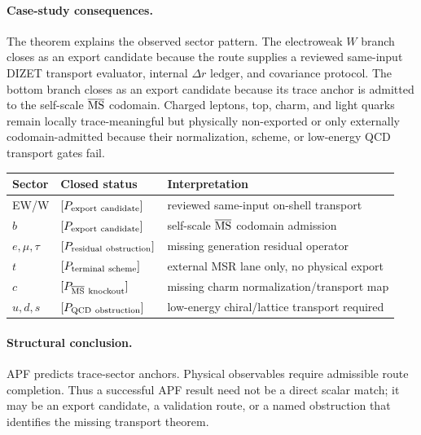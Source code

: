 \paragraph{Case-study consequences.}
The theorem explains the observed sector pattern.  The electroweak $W$ branch closes as an export candidate because the route supplies a reviewed same-input DIZET transport evaluator, internal $\Delta r$ ledger, and covariance protocol.  The bottom branch closes as an export candidate because its trace anchor is admitted to the self-scale $\overline{\rm MS}$ codomain.  Charged leptons, top, charm, and light quarks remain locally trace-meaningful but physically non-exported or only externally codomain-admitted because their normalization, scheme, or low-energy QCD transport gates fail.

\begin{center}
\begin{tabular}{lll}
\hline
Sector & Closed status & Interpretation\\
\hline
EW/W & $[P_{\rm export\ candidate}]$ & reviewed same-input on-shell transport\\
$b$ & $[P_{\rm export\ candidate}]$ & self-scale $\overline{\rm MS}$ codomain admission\\
$e,\mu,\tau$ & $[P_{\rm residual\ obstruction}]$ & missing generation residual operator\\
$t$ & $[P_{\rm terminal\ scheme}]$ & external MSR lane only, no physical export\\
$c$ & $[P_{\overline{\rm MS}\ {\rm knockout}}]$ & missing charm normalization/transport map\\
$u,d,s$ & $[P_{\rm QCD\ obstruction}]$ & low-energy chiral/lattice transport required\\
\hline
\end{tabular}
\end{center}

\paragraph{Structural conclusion.}
APF predicts trace-sector anchors.  Physical observables require admissible route completion.  Thus a successful APF result need not be a direct scalar match; it may be an export candidate, a validation route, or a named obstruction that identifies the missing transport theorem.
